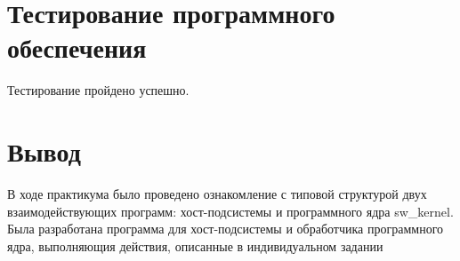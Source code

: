 \section{Тестирование программного обеспечения}

Тестирование пройдено успешно.

\section{Вывод}
В ходе практикума было проведено ознакомление с типовой структурой двух взаимодействующих программ: хост-подсистемы и программного ядра sw\_kernel.
Была разработана программа для хост-подсистемы и обработчика программного ядра, выполняющия действия, описанные в индивидуальном задании